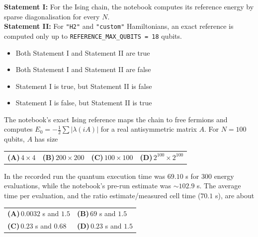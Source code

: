 \documentclass[11pt,a4paper]{article}
\newcommand{\optlabel}[1]{\textbf{(#1)}}
\newenvironment{qitem}[1]{\begin{list}{}{\setlength{\leftmargin}{3.3em}\setlength{\labelwidth}{3.1em}%
  \setlength{\labelsep}{0.2em}\setlength{\topsep}{3pt}\setlength{\parsep}{3pt}}\item[\textbf{Q.#1}\hfill]}{\end{list}}
\newcommand{\qsep}{\par\vspace{2pt}{\color{black!15}\hrule}\vspace{4pt}}
\begin{document}
\begin{qitem}{74}
\textbf{Statement I:} For the Ising chain, the notebook computes its reference energy by sparse diagonalisation for every $N$.\\[1mm]
\textbf{Statement II:} For \texttt{"H2"} and \texttt{"custom"} Hamiltonians, an exact reference is computed only up to \texttt{REFERENCE\_MAX\_QUBITS = 18} qubits.
\begin{itemize}[leftmargin=2.6em, labelsep=0.4em, itemsep=2pt, topsep=3pt]
\item[\optlabel{A}] Both Statement I and Statement II are true
\item[\optlabel{B}] Both Statement I and Statement II are false
\item[\optlabel{C}] Statement I is true, but Statement II is false
\item[\optlabel{D}] Statement I is false, but Statement II is true
\end{itemize}
\end{qitem}
\qsep

\begin{qitem}{75}
The notebook's exact Ising reference maps the chain to free fermions and computes $E_0 = -\tfrac12\sum|\lambda(iA)|$ for a real antisymmetric matrix $A$. For
$N = 100$ qubits, $A$ has size
\par\smallskip\noindent\begin{tabularx}{\linewidth}{@{}*{4}{L}@{}}
\optlabel{A}\,$4\times4$ & \optlabel{B}\,$200\times200$ & \optlabel{C}\,$100\times100$ & \optlabel{D}\,$2^{100}\times2^{100}$
\end{tabularx}
\end{qitem}
\qsep

\begin{qitem}{76}
In the recorded run the quantum execution time was $69.10$ s for $300$ energy evaluations, while the notebook's pre-run estimate was $\sim102.9$ s.
The average time per evaluation, and the ratio estimate/measured cell time ($70.1$ s), are about
\par\smallskip\noindent\begin{tabularx}{\linewidth}{@{}*{2}{L}@{}}
\optlabel{A}\,$0.0032$ s and $1.5$ & \optlabel{B}\,$69$ s and $1.5$ \\[3pt]
\optlabel{C}\,$0.23$ s and $0.68$ & \optlabel{D}\,$0.23$ s and $1.5$
\end{tabularx}
\end{qitem}
\qsep
\end{document}
